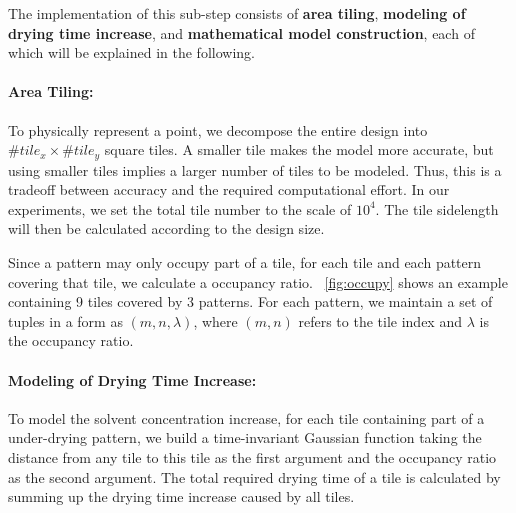 
The implementation of this sub-step consists of \textbf{area tiling},
\textbf{modeling of drying time increase},
and \textbf{mathematical model construction},
each of which will be explained in the following.

\paragraph{Area Tiling: }
To physically represent a point,
we decompose the entire design into $\#tile_x \times \#tile_y$ square tiles.
A smaller tile makes the model more accurate,
but using smaller tiles implies a larger number of tiles to be modeled.
Thus,
this is a tradeoff between accuracy and the required computational effort.
In our experiments,
we set the total tile number to the scale of $10^4$.
The tile sidelength will then be calculated according to the design size.

Since a pattern may only occupy part of a tile,
for each tile and each pattern covering that tile,
we calculate a occupancy ratio.
\figurename~\ref{fig:occupy} shows an example containing 9 tiles covered by 3 patterns.
For each pattern, we maintain a set of tuples in a form as $(m,n,\lambda)$,
where $(m,n)$ refers to the tile index and $\lambda$ is the occupancy ratio.

\paragraph{Modeling of Drying Time Increase: }

To model the solvent concentration increase,
for each tile containing part of a under-drying pattern,
we build a time-invariant Gaussian function taking the distance from any tile to this tile as the first argument and the occupancy ratio as the second argument.
The total required drying time of a tile is calculated by summing up the drying time increase caused by all tiles.

